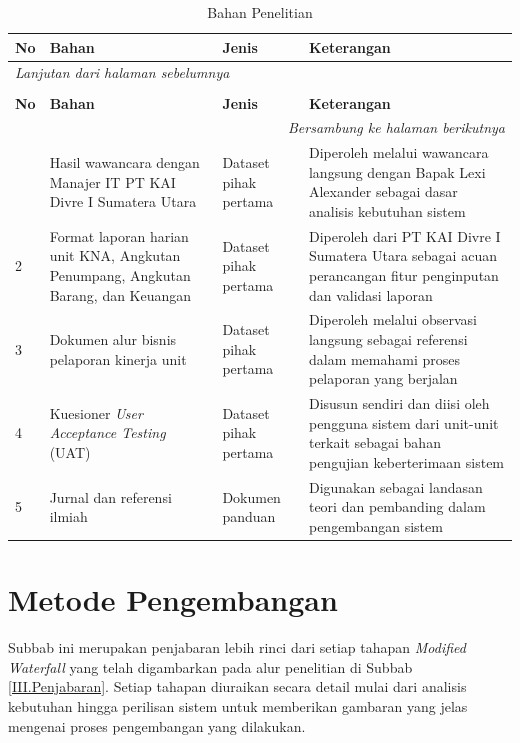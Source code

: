 \begin{longtable}{|p{}|p{}|p{}|p{}|}
    \caption{Bahan Penelitian}
    \label{table:3.bahan}\\
    \hline
    \textbf{No} & \textbf{Bahan} & \textbf{Jenis} & \textbf{Keterangan} \\
    \hline
    \endfirsthead
    \multicolumn{4}{l}{\textit{Lanjutan dari halaman sebelumnya}} \\
    \caption[]{Bahan Penelitian} \\
    \hline
    \textbf{No} & \textbf{Bahan} & \textbf{Jenis} & \textbf{Keterangan} \\
    \hline
    \endhead
    \hline
    \multicolumn{4}{r}{\textit{Bersambung ke halaman berikutnya}} \\
    \endfoot
    \endlastfoot
    1 & Hasil wawancara dengan Manajer IT PT KAI Divre I Sumatera Utara & Dataset pihak pertama & Diperoleh melalui wawancara langsung dengan Bapak Lexi Alexander sebagai dasar analisis kebutuhan sistem \\
    \hline
    2 & Format laporan harian unit KNA, Angkutan Penumpang, Angkutan Barang, dan Keuangan & Dataset pihak pertama & Diperoleh dari PT KAI Divre I Sumatera Utara sebagai acuan perancangan fitur penginputan dan validasi laporan \\
    \hline
    3 & Dokumen alur bisnis pelaporan kinerja unit & Dataset pihak pertama & Diperoleh melalui observasi langsung sebagai referensi dalam memahami proses pelaporan yang berjalan \\
    \hline
    4 & Kuesioner \textit{User Acceptance Testing} (UAT) & Dataset pihak pertama & Disusun sendiri dan diisi oleh pengguna sistem dari unit-unit terkait sebagai bahan pengujian keberterimaan sistem \\
    \hline
    5 & Jurnal dan referensi ilmiah & Dokumen panduan & Digunakan sebagai landasan teori dan pembanding dalam pengembangan sistem \\
    \hline
\end{longtable}

\section{Metode Pengembangan} \label{III.MetodePengembangan}
Subbab ini merupakan penjabaran lebih rinci dari setiap tahapan \textit{Modified Waterfall} yang telah digambarkan pada alur penelitian di Subbab \ref{III.Penjabaran}. Setiap tahapan diuraikan secara detail mulai dari analisis kebutuhan hingga perilisan sistem untuk memberikan gambaran yang jelas mengenai proses pengembangan yang dilakukan.

